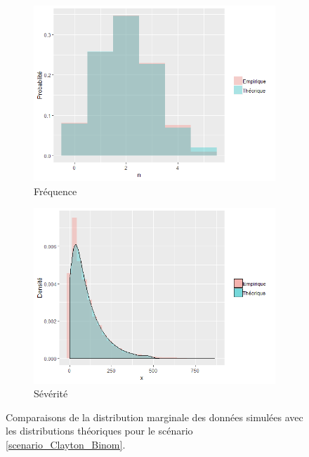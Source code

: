 \documentclass{article}
\begin{document}
	
		\begin{figure}[H]
		\begin{subfigure}[l]{0.5\textwidth}
			\includegraphics[width=\textwidth]{Graph/Clayton_Binom_N.png}
			\caption{Fréquence}
		\end{subfigure}
		\begin{subfigure}[r]{0.5\textwidth}
			\includegraphics[width=\textwidth]{Graph/Clayton_Binom_X.png}
			\caption{Sévérité}
		\end{subfigure}
		\caption{Comparaisons de la distribution marginale des données simulées avec les distributions théoriques pour le scénario \ref{scenario_Clayton_Binom}.}
		\label{graph_densite_Binom}
		\end{figure}
		
\end{document}
